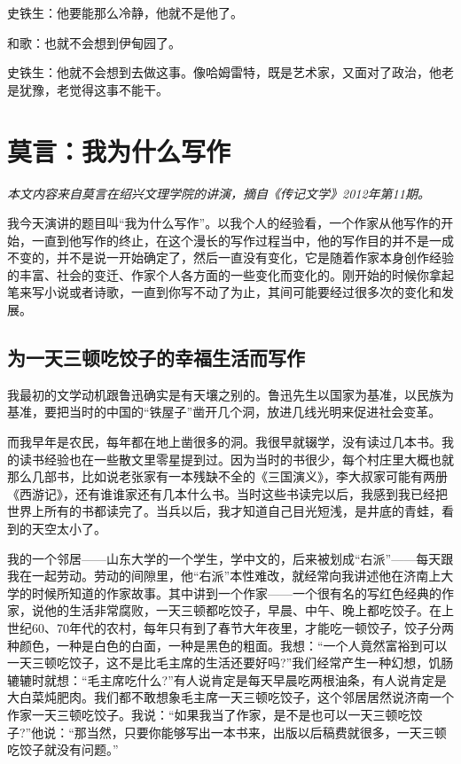 \documentclass[fontset=fandol,12pt,a5paper]{ctexbook}
\begin{document}
史铁生：他要能那么冷静，他就不是他了。

和歌：也就不会想到伊甸园了。

史铁生：他就不会想到去做这事。像哈姆雷特，既是艺术家，又面对了政治，他老是犹豫，老觉得这事不能干。

\newpage

\section{莫言：我为什么写作}
\emph{本文内容来自莫言在绍兴文理学院的讲演，摘自《传记文学》2012年第11期。}
\vspace{2em}

我今天演讲的题目叫“我为什么写作”。以我个人的经验看，一个作家从他写作的开始，一直到他写作的终止，在这个漫长的写作过程当中，他的写作目的并不是一成不变的，并不是说一开始确定了，然后一直没有变化，它是随着作家本身创作经验的丰富、社会的变迁、作家个人各方面的一些变化而变化的。刚开始的时候你拿起笔来写小说或者诗歌，一直到你写不动了为止，其间可能要经过很多次的变化和发展。

\subsection{为一天三顿吃饺子的幸福生活而写作}

我最初的文学动机跟鲁迅确实是有天壤之别的。鲁迅先生以国家为基准，以民族为基准，要把当时的中国的“铁屋子”凿开几个洞，放进几线光明来促进社会变革。

而我早年是农民，每年都在地上凿很多的洞。我很早就辍学，没有读过几本书。我的读书经验也在一些散文里零星提到过。因为当时的书很少，每个村庄里大概也就那么几部书，比如说老张家有一本残缺不全的《三国演义》，李大叔家可能有两册《西游记》，还有谁谁家还有几本什么书。当时这些书读完以后，我感到我已经把世界上所有的书都读完了。当兵以后，我才知道自己目光短浅，是井底的青蛙，看到的天空太小了。

我的一个邻居——山东大学的一个学生，学中文的，后来被划成“右派”——每天跟我在一起劳动。劳动的间隙里，他“右派”本性难改，就经常向我讲述他在济南上大学的时候所知道的作家故事。其中讲到一个作家——一个很有名的写红色经典的作家，说他的生活非常腐败，一天三顿都吃饺子，早晨、中午、晚上都吃饺子。在上世纪60、70年代的农村，每年只有到了春节大年夜里，才能吃一顿饺子，饺子分两种颜色，一种是白色的白面，一种是黑色的粗面。我想：“一个人竟然富裕到可以一天三顿吃饺子，这不是比毛主席的生活还要好吗?”我们经常产生一种幻想，饥肠辘辘时就想：“毛主席吃什么?”有人说肯定是每天早晨吃两根油条，有人说肯定是大白菜炖肥肉。我们都不敢想象毛主席一天三顿吃饺子，这个邻居居然说济南一个作家一天三顿吃饺子。我说：“如果我当了作家，是不是也可以一天三顿吃饺子?”他说：“那当然，只要你能够写出一本书来，出版以后稿费就很多，一天三顿吃饺子就没有问题。”
\end{document}
